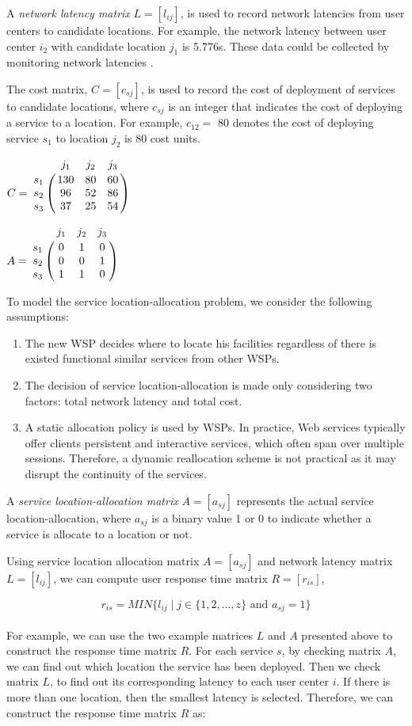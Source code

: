 \documentclass{llncs}
\let\bbordermatrix\bordermatrix
\begin{document}
A \emph{network latency matrix} $L = [l_{ij}]$, is used to record network latencies from user centers to 
candidate locations. For example, the network latency between user center $i_{2}$ with candidate location $j_{1}$ 
is 5.776s. These data could be collected by monitoring network latencies \cite{6076756} \cite{5552800}.

The cost matrix, $C = [c_{sj}]$, is used to record the cost of deployment of services to candidate locations, 
where $c_{sj}$ is an integer that indicates the cost of deploying a service to a location. 
For example, $c_{12} = $ 80 denotes the cost of deploying service $s_{1}$ to location $j_{2}$ is 80 cost units.

\parbox{.45\linewidth}{
{\centering
$
C = \bbordermatrix{~ & j_{1} & j_{2} & j_{3}\cr
					s_{1}	&130 &80 &60\cr
					s_{2}	&96  &52 &86\cr
					s_{3}	&37 &25 &54\cr}
$
\\}
}
\parbox{.45\linewidth}{
{\centering
$
A = \bbordermatrix{~ & j_{1} & j_{2} & j_{3}\cr
					s_{1}	&0 &1 &0	\cr
					s_{2}	&0  &0 &1	\cr
					s_{3}	&1 &1 &0	\cr}
$
\\}
}

To model the service location-allocation problem, we consider the following assumptions:
\begin{enumerate}
	\item The new WSP decides where to locate his facilities regardless of there is existed functional similar services from other WSPs.
	\item The decision of service location-allocation is made only considering two factors: total network latency and total cost.
	\item A static allocation policy is used by WSPs. In practice, Web services typically offer clients persistent and interactive services, which often span over multiple sessions. Therefore, a dynamic reallocation scheme is not practical as it may disrupt the continuity of the services.
\end{enumerate}


A \emph{service location-allocation matrix} $A = [a_{sj}]$ represents the actual service location-allocation, where $a_{sj}$  is a binary value 1 or 0 to indicate whether a service is allocate to a location or not.

Using service location allocation matrix $A = [a_{sj}]$ and network latency matrix $L = [l_{ij}]$, we can compute user
response time matrix $R = [r_{is}]$, 

{\centering
	\begin{equation}
		r_{is} = MIN\{l_{ij} \mid j \in \{1, 2, ..., z\} \text{ and } a_{sj} = 1\}
	\end{equation}
\\}
For example, we can use the two example matrices $L$ and $A$ presented above to construct the response time matrix $R$. 
For each service $s$, by checking matrix $A$, we can find out which location the service has been deployed.
Then we check matrix $L$, to find out its corresponding latency to each user center $i$. If there is
more than one location, then the smallest latency is selected. Therefore, we can construct the response time matrix $R$ as:
\end{document}
